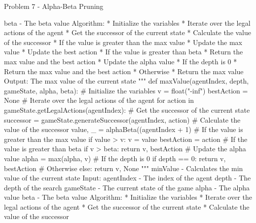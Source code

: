 \begin{problem}{Problem 7 - Alpha-Beta Pruning}
\begin{highlight}[Solution]
\begin{code}[Python]
                beta - The beta value
                Algorithm:
                * Initialize the variables
                * Iterate over the legal actions of the agent
                    * Get the successor of the current state
                    * Calculate the value of the successor
                    * If the value is greater than the max value
                    * Update the max value
                    * Update the best action
                    * If the value is greater than beta
                    * Return the max value and the best action
                    * Update the alpha value
                * If the depth is 0
                    * Return the max value and the best action
                * Otherwise
                    * Return the max value
                Output:
                The max value of the current state
        """
        def maxValue(agentIndex, depth, gameState, alpha, beta):
            # Initialize the variables
            v = float("-inf")
            bestAction = None
            # Iterate over the legal actions of the agent
            for action in gameState.getLegalActions(agentIndex):
                # Get the successor of the current state
                successor = gameState.generateSuccessor(agentIndex, action)
                # Calculate the value of the successor
                value, _ = alphaBeta((agentIndex + 1) %
                # If the value is greater than the max value
                if value > v:
                    v = value
                    bestAction = action
                # If the value is greater than beta
                if v > beta:
                    return v, bestAction
                # Update the alpha value
                alpha = max(alpha, v)
            # If the depth is 0
            if depth == 0:
                return v, bestAction
            # Otherwise
            else:
                return v, None
        """ minValue - Calculates the min value of the current state
                Input:
                agentIndex - The index of the agent
                depth - The depth of the search
                gameState - The current state of the game
                alpha - The alpha value
                beta - The beta value
                Algorithm:
                * Initialize the variables
                * Iterate over the legal actions of the agent
                    * Get the successor of the current state
                    * Calculate the value of the successor

\end{code}
\end{highlight}
\end{problem}
